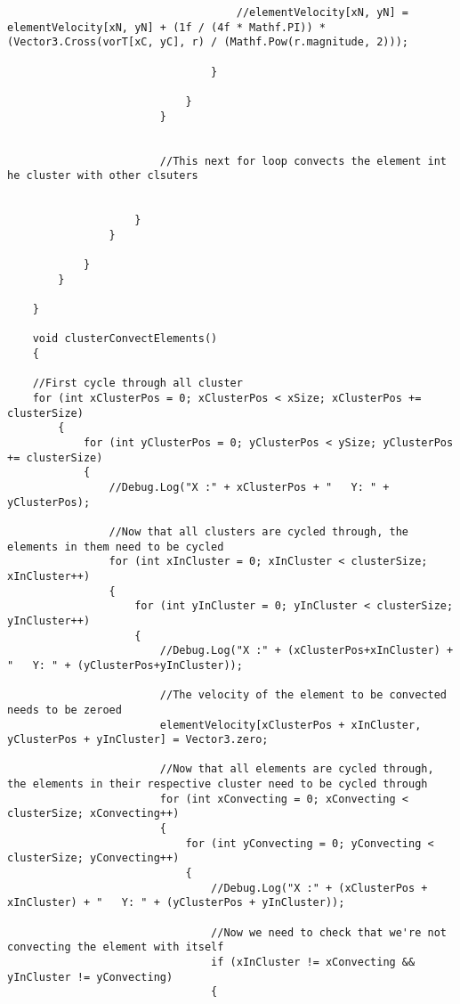 \begin{mdframed}[linecolor=black, topline=true, bottomline=true,
  leftline=false, rightline=false]
\begin{verbatim}
                                    //elementVelocity[xN, yN] = elementVelocity[xN, yN] + (1f / (4f * Mathf.PI)) * (Vector3.Cross(vorT[xC, yC], r) / (Mathf.Pow(r.magnitude, 2)));

                                }

                            }
                        }


                        //This next for loop convects the element int he cluster with other clsuters


                    }
                }

            }
        }

    }

    void clusterConvectElements()
    {

    //First cycle through all cluster
    for (int xClusterPos = 0; xClusterPos < xSize; xClusterPos += clusterSize)
        {
            for (int yClusterPos = 0; yClusterPos < ySize; yClusterPos += clusterSize)
            {
                //Debug.Log("X :" + xClusterPos + "   Y: " + yClusterPos);

                //Now that all clusters are cycled through, the elements in them need to be cycled
                for (int xInCluster = 0; xInCluster < clusterSize; xInCluster++)
                {
                    for (int yInCluster = 0; yInCluster < clusterSize; yInCluster++)
                    {
                        //Debug.Log("X :" + (xClusterPos+xInCluster) + "   Y: " + (yClusterPos+yInCluster));

                        //The velocity of the element to be convected needs to be zeroed
                        elementVelocity[xClusterPos + xInCluster, yClusterPos + yInCluster] = Vector3.zero;

                        //Now that all elements are cycled through, the elements in their respective cluster need to be cycled through
                        for (int xConvecting = 0; xConvecting < clusterSize; xConvecting++)
                        {
                            for (int yConvecting = 0; yConvecting < clusterSize; yConvecting++)
                            {
                                //Debug.Log("X :" + (xClusterPos + xInCluster) + "   Y: " + (yClusterPos + yInCluster));

                                //Now we need to check that we're not convecting the element with itself
                                if (xInCluster != xConvecting && yInCluster != yConvecting)
                                {


\end{verbatim}
\end{mdframed}

